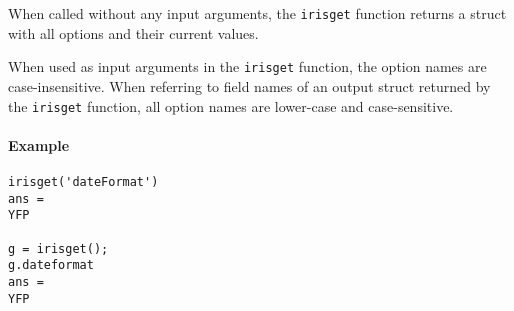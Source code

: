 When called without any input arguments, the \texttt{irisget} function
returns a struct with all options and their current values.

When used as input arguments in the \texttt{irisget} function, the
option names are case-insensitive. When referring to field names of an
output struct returned by the \texttt{irisget} function, all option
names are lower-case and case-sensitive.

\paragraph{Example}

\begin{verbatim}
irisget('dateFormat')
ans =
YFP

g = irisget();
g.dateformat
ans =
YFP
\end{verbatim}



